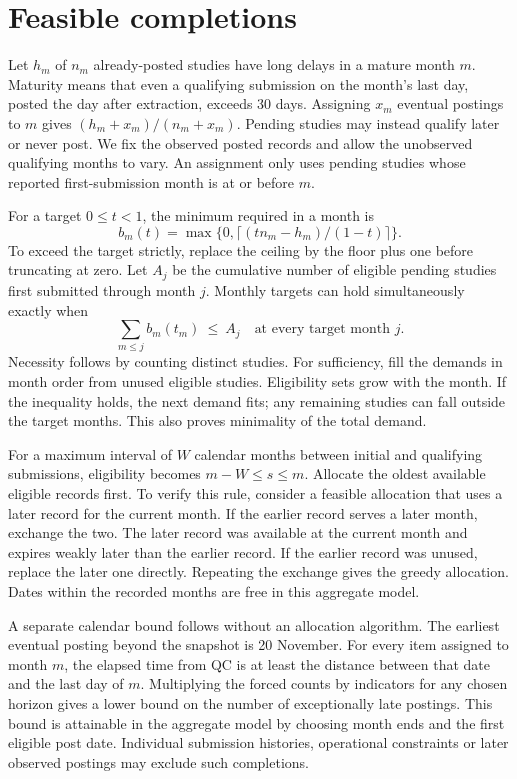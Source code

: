 \documentclass[11pt]{article}
\begin{document}
\section{Feasible completions}
Let $h_m$ of $n_m$ already-posted studies have long delays in a mature month $m$. Maturity means that even a qualifying submission on the month's last day, posted the day after extraction, exceeds 30 days. Assigning $x_m$ eventual postings to $m$ gives $(h_m+x_m)/(n_m+x_m)$. Pending studies may instead qualify later or never post. We fix the observed posted records and allow the unobserved qualifying months to vary. An assignment only uses pending studies whose reported first-submission month is at or before $m$.

For a target $0\le t<1$, the minimum required in a month is
\[
 b_m(t)=\max\{0,\lceil(t n_m-h_m)/(1-t)\rceil\}.
\]
To exceed the target strictly, replace the ceiling by the floor plus one before truncating at zero. Let $A_j$ be the cumulative number of eligible pending studies first submitted through month $j$. Monthly targets can hold simultaneously exactly when
\[
                   \sum_{m\le j} b_m(t_m)\ \le\ A_j
                   \quad\text{at every target month } j.
\]
Necessity follows by counting distinct studies. For sufficiency, fill the demands in month order from unused eligible studies. Eligibility sets grow with the month. If the inequality holds, the next demand fits; any remaining studies can fall outside the target months. This also proves minimality of the total demand.

For a maximum interval of $W$ calendar months between initial and qualifying submissions, eligibility becomes $m-W\le s\le m$. Allocate the oldest available eligible records first. To verify this rule, consider a feasible allocation that uses a later record for the current month. If the earlier record serves a later month, exchange the two. The later record was available at the current month and expires weakly later than the earlier record. If the earlier record was unused, replace the later one directly. Repeating the exchange gives the greedy allocation. Dates within the recorded months are free in this aggregate model.

A separate calendar bound follows without an allocation algorithm. The earliest eventual posting beyond the snapshot is 20 November. For every item assigned to month $m$, the elapsed time from QC is at least the distance between that date and the last day of $m$. Multiplying the forced counts by indicators for any chosen horizon gives a lower bound on the number of exceptionally late postings. This bound is attainable in the aggregate model by choosing month ends and the first eligible post date. Individual submission histories, operational constraints or later observed postings may exclude such completions.
\newpage
\end{document}
